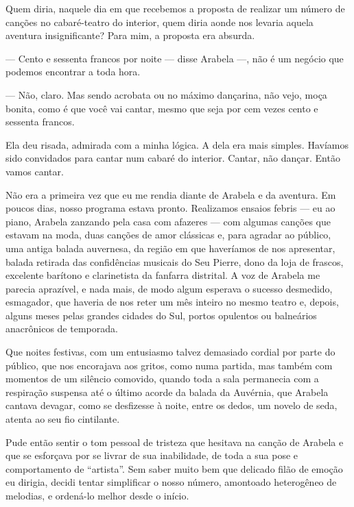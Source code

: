 Quem diria, naquele dia em que recebemos a proposta de realizar um
número de canções no cabaré-teatro do interior, quem diria aonde nos
levaria aquela aventura insignificante? Para mim, a proposta era
absurda.

--- Cento e sessenta francos por noite --- disse Arabela ---, não é um
negócio que podemos encontrar a toda hora.

--- Não, claro. Mas sendo acrobata ou no máximo dançarina, não vejo,
moça bonita, como é que você vai cantar, mesmo que seja por cem vezes
cento e sessenta francos.

Ela deu risada, admirada com a minha lógica. A dela era mais simples.
Havíamos sido convidados para cantar num cabaré do interior. Cantar, não
dançar. Então vamos cantar.


Não era a primeira vez que eu me rendia diante de Arabela e da aventura.
Em poucos dias, nosso programa estava pronto. Realizamos ensaios febris
--- eu ao piano, Arabela zanzando pela casa com afazeres --- com algumas
canções que estavam na moda, duas canções de amor clássicas e, para
agradar ao público, uma antiga balada auvernesa, da região em que
haveríamos de nos apresentar, balada retirada das confidências musicais
do Seu Pierre, dono da loja de frascos, excelente barítono e
clarinetista da fanfarra distrital. A voz de Arabela me parecia
aprazível, e nada mais, de modo algum esperava o sucesso desmedido,
esmagador, que haveria de nos reter um mês inteiro no mesmo teatro e,
depois, alguns meses pelas grandes cidades do Sul, portos opulentos ou
balneários anacrônicos de temporada.

Que noites festivas, com um entusiasmo talvez demasiado cordial por
parte do público, que nos encorajava aos gritos, como numa partida, mas
também com momentos de um silêncio comovido, quando toda a sala
permanecia com a respiração suspensa até o último acorde da balada da
Auvérnia, que Arabela cantava devagar, como se desfizesse à noite, entre
os dedos, um novelo de seda, atenta ao seu fio cintilante.

Pude então sentir o tom pessoal de tristeza que hesitava na canção de
Arabela e que se esforçava por se livrar de sua inabilidade, de toda a
sua pose e comportamento de ``artista''. Sem saber muito bem que
delicado filão de emoção eu dirigia, decidi tentar simplificar o nosso
número, amontoado heterogêneo de melodias, e ordená-lo melhor desde o
início.

